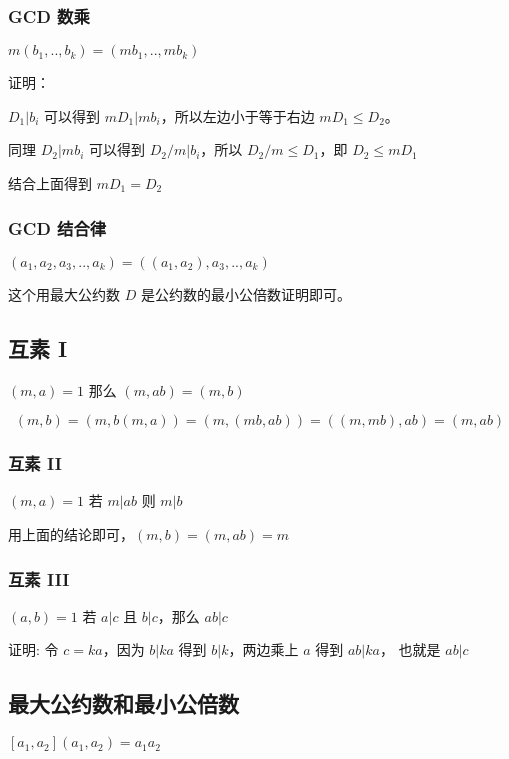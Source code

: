 \documentclass[12pt,a4paper]{ctexart}
\begin{document}
\subsubsection{GCD 数乘}

$m(b_1,..,b_k) = (mb_1,..,mb_k)$

证明：

$D_1 \vert b_i$ 可以得到 $mD_1 \vert mb_i$，所以左边小于等于右边 $mD_1 \le D_2$。

同理 $D_2 \vert mb_i$ 可以得到 $D_2/m \vert b_i$，所以 $D_2/m \le D_1$，即 $D_2 \le mD_1$

结合上面得到 $mD_1 = D_2$

\subsubsection{GCD 结合律}

$(a_1,a_2,a_3,..,a_k) = ((a_1,a_2),a_3,..,a_k)$

这个用最大公约数 $D$ 是公约数的最小公倍数证明即可。

\subsection{互素 I}

$(m,a) = 1$ 那么 $(m,ab) = (m,b)$

\[
(m,b) = (m,b(m,a)) = (m,(mb,ab)) = ((m,mb),ab) = (m,ab)
\]

\subsubsection{互素 II}

$(m,a)=1$ 若 $m \vert ab$ 则 $m \vert b$

用上面的结论即可，$(m,b) = (m,ab) = m$


\subsubsection{互素 III}

$(a,b) = 1$ 若 $a \vert c$ 且 $b \vert c$，那么 $ab \vert c$

证明: 令 $c = ka$，因为 $b \vert ka$ 得到 $b \vert k$，两边乘上 $a$ 得到 $ab \vert ka$，
也就是 $ab \vert c$


\subsection{最大公约数和最小公倍数}

$[a_1,a_2](a_1,a_2) = a_1a_2$
\end{document}
